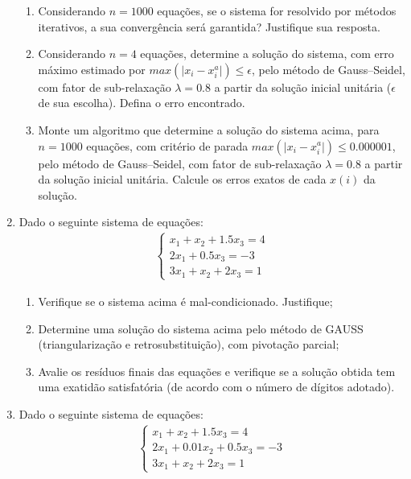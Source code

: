 \documentclass[12pt]{article}
\newenvironment{smallitem}{
    \vspace{-2mm}
    \begin{enumerate}
    \setlength{\parskip}{0pt}
    \setlength{\itemsep}{2pt}
}{
    \vspace{-2mm}
    \end{enumerate}
}
\begin{document}
\begin{enumerate}[label=\textbf{\arabic*})]
\begin{smallitem}

\item Considerando $n = 1000$ equações, se o sistema for resolvido por métodos
iterativos, a sua convergência será garantida? Justifique sua resposta.

\item Considerando $n = 4$ equações, determine a solução do sistema, com erro
máximo estimado por $max(\vert x_i - x_i^a \vert) \leq \epsilon$, pelo método
de Gauss--Seidel, com fator de sub-relaxação $\lambda = 0.8$ a partir da
solução inicial unitária ($\epsilon$ de sua escolha). Defina o erro
encontrado.

\item Monte um algoritmo que determine a solução do sistema acima, para $n =
1000$ equações, com critério de parada $max(\vert x_i - x_i^a \vert) \leq
0.000001$, pelo método de Gauss--Seidel, com fator de sub-relaxação $\lambda =
0.8$ a partir da solução inicial unitária. Calcule os erros exatos de cada
$x(i)$ da solução.

\end{smallitem}

\item Dado o seguinte sistema de equações:
\begin{align*}
\begin{cases}
x_1 + x_2 + 1.5x_3 = 4 \\
2x_1 + 0.5x_3 = -3 \\
3x_1 + x_2 + 2x_3 = 1
\end{cases}
\end{align*}

\begin{smallitem}

\item Verifique se o sistema acima é mal-condicionado. Justifique;

\item Determine uma solução do sistema acima pelo método de GAUSS
(triangularização e retrosubstituição), com pivotação parcial;

\item Avalie os resíduos finais das equações e verifique se a solução obtida
tem uma exatidão satisfatória (de acordo com o número de dígitos adotado).

\end{smallitem}

\item Dado o seguinte sistema de equações:
\begin{align*}
\begin{cases}
x_1 + x_2 + 1.5x_3 = 4 \\
2x_1 + 0.01x_2 + 0.5x_3 = -3 \\
3x_1 + x_2 + 2x_3 = 1
\end{cases}
\end{align*}


\end{enumerate}
\end{document}

